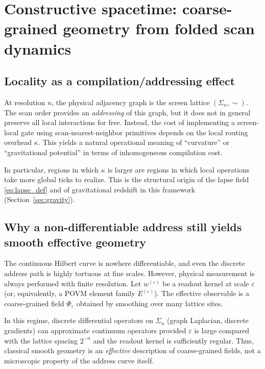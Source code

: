 
\section{Constructive spacetime: coarse-grained geometry from folded scan dynamics}
\label{sec:constructive_spacetime}

\subsection{Locality as a compilation/addressing effect}
\label{sec:locality_as_address}

At resolution $n$, the physical adjacency graph is the screen lattice $(\Sigma_n,\sim)$.
The scan order provides an \emph{addressing} of this graph, but it does not in general preserve all local interactions for free.
Instead, the cost of implementing a screen-local gate using scan-nearest-neighbor primitives depends on the local routing overhead $\kappa$.
This yields a natural operational meaning of ``curvature'' or ``gravitational potential'' in terms of inhomogeneous compilation cost.

In particular, regions in which $\kappa$ is larger are regions in which local operations take more global ticks to realize.
This is the structural origin of the lapse field \eqref{eq:lapse_def} and of gravitational redshift in this framework (Section~\ref{sec:gravity}).

\subsection{Why a non-differentiable address still yields smooth effective geometry}
\label{sec:coarse_graining_geometry}

The continuous Hilbert curve is nowhere differentiable, and even the discrete address path is highly tortuous at fine scales.
However, physical measurement is always performed with finite resolution.
Let $w^{(\varepsilon)}$ be a readout kernel at scale $\varepsilon$ (or, equivalently, a POVM element family $E^{(\varepsilon)}$).
The effective observable is a coarse-grained field $\Phi_\varepsilon$ obtained by smoothing over many lattice sites.

In this regime, discrete differential operators on $\Sigma_n$ (graph Laplacian, discrete gradients) can approximate continuum operators provided $\varepsilon$ is large compared with the lattice spacing $2^{-n}$ and the readout kernel is sufficiently regular.
Thus, classical smooth geometry is an \emph{effective} description of coarse-grained fields, not a microscopic property of the address curve itself.

